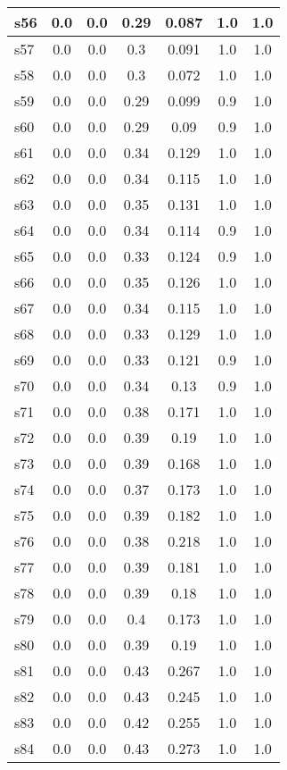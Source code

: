 \documentclass{article}
\begin{document}
\begin{tabular}{|l|c|c|c|c|c|c|}
\hline
s56 &0.0 & 0.0 & 0.29 & 0.087 & 1.0 & 1.0\\
\hline
s57 &0.0 & 0.0 & 0.3 & 0.091 & 1.0 & 1.0\\
\hline
s58 &0.0 & 0.0 & 0.3 & 0.072 & 1.0 & 1.0\\
\hline
s59 &0.0 & 0.0 & 0.29 & 0.099 & 0.9 & 1.0\\
\hline
s60 &0.0 & 0.0 & 0.29 & 0.09 & 0.9 & 1.0\\
\hline
s61 &0.0 & 0.0 & 0.34 & 0.129 & 1.0 & 1.0\\
\hline
s62 &0.0 & 0.0 & 0.34 & 0.115 & 1.0 & 1.0\\
\hline
s63 &0.0 & 0.0 & 0.35 & 0.131 & 1.0 & 1.0\\
\hline
s64 &0.0 & 0.0 & 0.34 & 0.114 & 0.9 & 1.0\\
\hline
s65 &0.0 & 0.0 & 0.33 & 0.124 & 0.9 & 1.0\\
\hline
s66 &0.0 & 0.0 & 0.35 & 0.126 & 1.0 & 1.0\\
\hline
s67 &0.0 & 0.0 & 0.34 & 0.115 & 1.0 & 1.0\\
\hline
s68 &0.0 & 0.0 & 0.33 & 0.129 & 1.0 & 1.0\\
\hline
s69 &0.0 & 0.0 & 0.33 & 0.121 & 0.9 & 1.0\\
\hline
s70 &0.0 & 0.0 & 0.34 & 0.13 & 0.9 & 1.0\\
\hline
s71 &0.0 & 0.0 & 0.38 & 0.171 & 1.0 & 1.0\\
\hline
s72 &0.0 & 0.0 & 0.39 & 0.19 & 1.0 & 1.0\\
\hline
s73 &0.0 & 0.0 & 0.39 & 0.168 & 1.0 & 1.0\\
\hline
s74 &0.0 & 0.0 & 0.37 & 0.173 & 1.0 & 1.0\\
\hline
s75 &0.0 & 0.0 & 0.39 & 0.182 & 1.0 & 1.0\\
\hline
s76 &0.0 & 0.0 & 0.38 & 0.218 & 1.0 & 1.0\\
\hline
s77 &0.0 & 0.0 & 0.39 & 0.181 & 1.0 & 1.0\\
\hline
s78 &0.0 & 0.0 & 0.39 & 0.18 & 1.0 & 1.0\\
\hline
s79 &0.0 & 0.0 & 0.4 & 0.173 & 1.0 & 1.0\\
\hline
s80 &0.0 & 0.0 & 0.39 & 0.19 & 1.0 & 1.0\\
\hline
s81 &0.0 & 0.0 & 0.43 & 0.267 & 1.0 & 1.0\\
\hline
s82 &0.0 & 0.0 & 0.43 & 0.245 & 1.0 & 1.0\\
\hline
s83 &0.0 & 0.0 & 0.42 & 0.255 & 1.0 & 1.0\\
\hline
s84 &0.0 & 0.0 & 0.43 & 0.273 & 1.0 & 1.0\\

\end{tabular}
\end{document}
